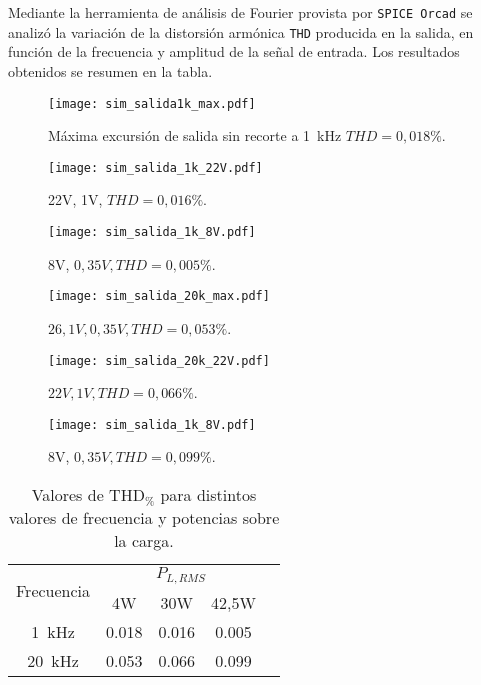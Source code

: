 	Mediante la herramienta de análisis de Fourier provista por \texttt{SPICE Orcad} se analizó la variación de la distorsión armónica \texttt{THD} producida en la salida, en función de la frecuencia y amplitud de la señal de entrada. Los resultados obtenidos se resumen en la tabla.


\begin{figure}[H]
	\centering
	\texttt{[image: sim\_salida1k\_max.pdf]}
	\caption{Máxima excursión de salida sin recorte a \SI{1}{\kilo\hertz} $THD = 0,018\%$.}
	\label{fig:sim_salida_1k_max}
	\end{figure}

\begin{figure}[H]
	\centering
	\texttt{[image: sim\_salida\_1k\_22V.pdf]}
	\caption{22V, 1V, $THD=0,016\%$.}
	\end{figure}

\begin{figure}[H]
	\centering
	\texttt{[image: sim\_salida\_1k\_8V.pdf]}
	\caption{8V, $0,35V, THD=0,005\%$.}
\end{figure}

\begin{figure}[H]
	\centering
	\texttt{[image: sim\_salida\_20k\_max.pdf]}
	\caption{$26,1V, 0,35V, THD=0,053\%$.}
\end{figure}

\begin{figure}[H]
	\centering
	\texttt{[image: sim\_salida\_20k\_22V.pdf]}
	\caption{$22V, 1V, THD=0,066\%$.}
\end{figure}

\begin{figure}[H]
	\centering
	\texttt{[image: sim\_salida\_1k\_8V.pdf]}
	\caption{8V, $0,35V, THD=0,099\%$.}
\end{figure}


\begin{table}[H]
	\centering
	\begin{tabular}{ccccc}
		\toprule
\multirow{2}{*}{Frecuencia} & \multicolumn{3}{c}{$P_{L,RMS}$} \\ 
		\cmidrule{2-4}
			& 4W & 30W & 42,5W \\
		\midrule
		\SI{1}{\kHz} & \num{0,018} & \num{0,016} & \num{0,005} \\
		\SI{20}{\kHz} & \num{0.053} & \num{0,066} & \num{0,099} \\
		\bottomrule
	\end{tabular}
	\caption{Valores de $\mathrm{THD}_{\%}$ para distintos valores de frecuencia y potencias sobre la carga.}
\end{table}




